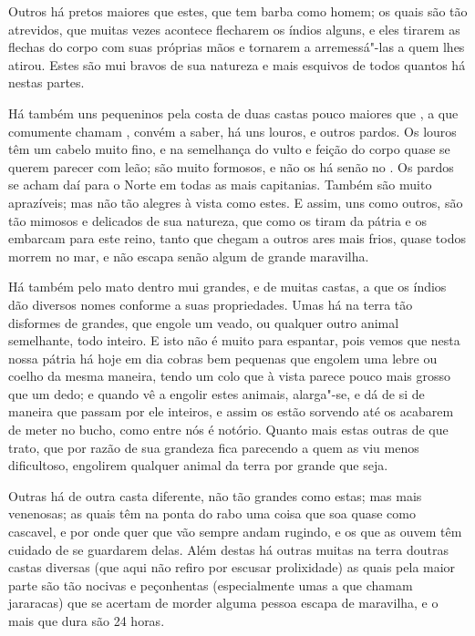 Outros há pretos maiores que estes, que tem barba como homem; os quais
são tão atrevidos, que muitas vezes acontece flecharem os índios
alguns, e eles tirarem as flechas do corpo com suas próprias mãos e tornarem a
arremessá"-las a quem lhes atirou. Estes são mui bravos de sua natureza
e mais esquivos de todos quantos há nestas partes.

Há também uns pequeninos pela costa de duas castas pouco maiores que
, a que comumente chamam , convém a saber, há uns louros,
e outros pardos. Os louros têm um cabelo muito fino, e na semelhança do			%
vulto e feição do corpo quase se querem parecer com leão; são muito			%
formosos, e não os há senão no . Os pardos se acham daí		
para o Norte em todas as mais capitanias. Também são muito aprazíveis;
mas não tão alegres à vista como estes. E assim, uns como outros, são tão
mimosos e delicados de sua natureza, que como os tiram da pátria e os
embarcam para este reino, tanto que chegam a outros ares mais frios,
quase todos morrem no mar, e não escapa senão algum de grande
maravilha.

Há também pelo mato dentro  mui grandes, e de muitas castas, a que
os índios dão diversos nomes conforme a suas propriedades. Umas há na
terra tão disformes de grandes, que engole um veado, ou qualquer outro
animal semelhante, todo inteiro. E isto não é muito para espantar, pois
vemos que nesta nossa pátria há hoje em dia cobras bem pequenas que		%
engolem uma lebre ou coelho da mesma maneira, tendo um colo que à vista
parece pouco mais grosso que um dedo; e quando vê a engolir estes
animais, alarga"-se, e dá de si de maneira que passam por ele inteiros,
e assim os estão sorvendo até os acabarem de meter no bucho, como entre
nós é notório. Quanto mais estas outras de que trato, que por razão de sua
grandeza fica parecendo a quem as viu menos dificultoso, engolirem
qualquer animal da terra por grande que seja.

Outras há de outra casta diferente, não tão grandes como estas; mas mais
venenosas; as quais têm na ponta do rabo uma coisa que soa quase como
cascavel, e por onde quer que vão sempre andam rugindo, e os que as		%
ouvem têm cuidado de se guardarem delas. Além destas há outras muitas
na terra doutras castas diversas (que aqui não refiro por escusar
prolixidade) as quais pela maior parte são tão nocivas e peçonhentas
(especialmente umas a que chamam jararacas) que se acertam de morder		
alguma pessoa escapa de maravilha, e o mais que dura são 24 horas.


